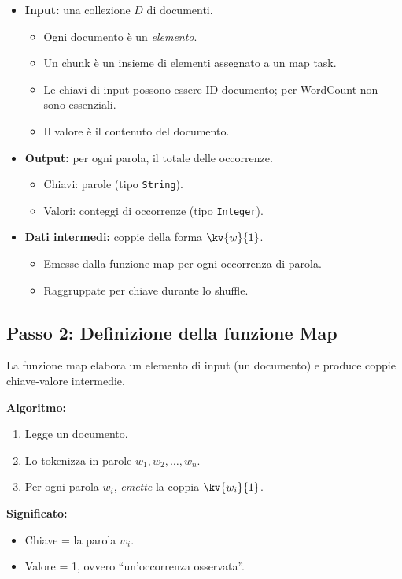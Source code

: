 \begin{itemize}
  \item \textbf{Input:} una collezione $D$ di documenti.
    \begin{itemize}
      \item Ogni documento è un \emph{elemento}.
      \item Un chunk è un insieme di elementi assegnato a un map task.
      \item Le chiavi di input possono essere ID documento; per WordCount
        non sono essenziali.
      \item Il valore è il contenuto del documento.
    \end{itemize}
  \item \textbf{Output:} per ogni parola, il totale delle occorrenze.
    \begin{itemize}
      \item Chiavi: parole (tipo \texttt{String}).
      \item Valori: conteggi di occorrenze (tipo \texttt{Integer}).
    \end{itemize}
  \item \textbf{Dati intermedi:} coppie della forma $\kv{w}{1}$.
    \begin{itemize}
      \item Emesse dalla funzione map per ogni occorrenza di parola.
      \item Raggruppate per chiave durante lo shuffle.
    \end{itemize}
\end{itemize}

\subsection{Passo 2: Definizione della funzione Map}

La funzione map elabora un elemento di input (un documento) e produce
coppie chiave-valore intermedie.

\textbf{Algoritmo:}
\begin{enumerate}
  \item Legge un documento.
  \item Lo tokenizza in parole $w_1, w_2, \ldots, w_n$.
  \item Per ogni parola $w_i$, \emph{emette} la coppia $\kv{w_i}{1}$.
\end{enumerate}

\textbf{Significato:}
\begin{itemize}
  \item Chiave = la parola $w_i$.
  \item Valore = 1, ovvero ``un'occorrenza osservata''.
\end{itemize}

